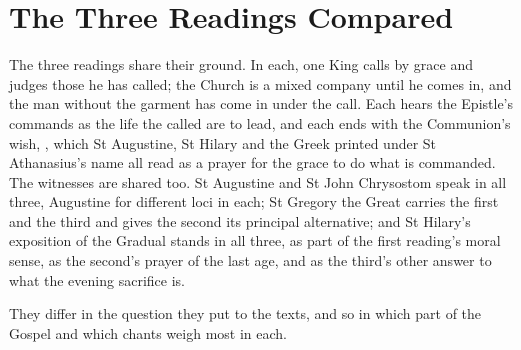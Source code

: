 \section{The Three Readings Compared}
\label{sec:comparison}

The three readings share their ground. In each, one King calls by grace and
judges those he has called; the Church is a mixed company until he comes in,
and the man without the garment has come in under the call. Each hears the
Epistle's commands as the life the called are to lead, and each ends with the
Communion's wish, , which St Augustine, St
Hilary and the Greek  printed under St
Athanasius's name all read as a prayer for the grace to do what is commanded.
The witnesses are shared too. St Augustine and St John Chrysostom speak in all
three, Augustine for different loci in each; St Gregory the Great carries the
first and the third and gives the second its principal alternative; and St
Hilary's exposition of the Gradual stands in all three, as part of the first
reading's moral sense, as the second's prayer of the last age, and as the
third's other answer to what the evening sacrifice is.

They differ in the question they put to the texts, and so in which part of
the Gospel and which chants weigh most in each.

